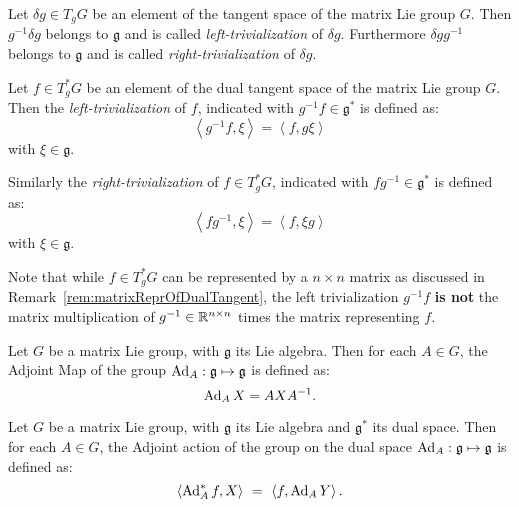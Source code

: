 \begin{lemma}
\label{lem:trivTangentSpace}
Let $\delta g \in T_g G$ be an element of the tangent space of the matrix Lie group $G$. Then $g^{-1} \delta g$ belongs to $\mathfrak{g}$ and is called \emph{left-trivialization} of $\delta g$. Furthermore $\delta g g^{-1}$ belongs to $\mathfrak{g}$ and is called \emph{right-trivialization} of $\delta g$.
\end{lemma}

\begin{lemma}
\label{lem:trivDualTangentSpace}
Let $f \in T_g^* G$ be an element of the dual tangent space of the matrix Lie group $G$. Then the \emph{left-trivialization} of $f$, indicated with $g^{-1} f \in \mathfrak{g}^*$ is defined as:
\begin{equation}
\left< g^{-1} f , \xi \right> =  \left<  f , g \xi \right> 
\end{equation}
with $\xi \in \mathfrak{g}$. 

Similarly the \emph{right-trivialization} of $f \in T_g^* G$, indicated with $f g^{-1} \in \mathfrak{g}^*$ is defined as:
\begin{equation}
\left< f  g^{-1} , \xi \right> =  \left<  f , \xi g \right> 
\end{equation}
with $\xi \in \mathfrak{g}$. 
\end{lemma}

\begin{remark}
Note that while $f \in T_g^* G$ can be represented by a $n \times n$ matrix as discussed in Remark~\ref{rem:matrixReprOfDualTangent}, the left trivialization $g^{-1} f$ \textbf{is not}  the matrix multiplication of $g^{-1} \in \mathbb{R}^{n \times n}$ times the matrix representing $f$. 
\end{remark}

\begin{definition}
\label{def:adjointActionOfGroupOnAlgebra}
Let $G$ be a matrix Lie group, with $\mathfrak{g}$ its Lie algebra. Then for each $A \in G$, the Adjoint Map of the group $\operatorname{Ad}_A : \mathfrak{g} \mapsto \mathfrak{g}$ is defined as:
\begin{equation}
   \operatorname{Ad}_A X = A X A^{-1}.
\end{equation}
\end{definition}

\begin{definition}
\label{def:adjointActionOfGroupOnDual}
Let $G$ be a matrix Lie group, with $\mathfrak{g}$ its Lie algebra and $\mathfrak{g}^*$ its dual space. Then for each $A \in G$, the Adjoint action of the group on the dual space $\operatorname{Ad}_A : \mathfrak{g} \mapsto \mathfrak{g}$ is defined as:
\begin{equation}
   \left< \operatorname{Ad}_A^* f , X \right> \ = \ \left< f , \operatorname{Ad}_A Y \right> .
\end{equation}
\end{definition}


